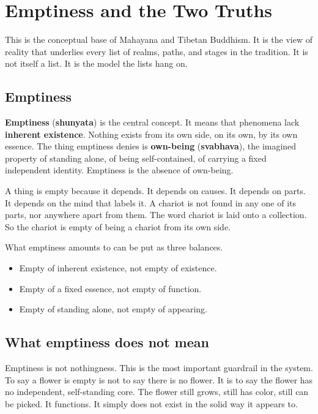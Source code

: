 \section{Emptiness and the Two Truths}

This is the conceptual base of Mahayana and Tibetan Buddhism. It is the view of reality that underlies every list of realms, paths, and stages in the tradition. It is not itself a list. It is the model the lists hang on.

\subsection*{Emptiness}

\textbf{Emptiness} (\textbf{shunyata}) is the central concept. It means that phenomena lack \textbf{inherent existence}. Nothing exists from its own side, on its own, by its own essence. The thing emptiness denies is \textbf{own-being} (\textbf{svabhava}), the imagined property of standing alone, of being self-contained, of carrying a fixed independent identity. Emptiness is the absence of own-being.

A thing is empty because it depends. It depends on causes. It depends on parts. It depends on the mind that labels it. A chariot is not found in any one of its parts, nor anywhere apart from them. The word chariot is laid onto a collection. So the chariot is empty of being a chariot from its own side.

What emptiness amounts to can be put as three balances.

\begin{itemize}
 \item Empty of inherent existence, not empty of existence.
 \item Empty of a fixed essence, not empty of function.
 \item Empty of standing alone, not empty of appearing.
\end{itemize}

\subsection*{What emptiness does not mean}

Emptiness is not nothingness. This is the most important guardrail in the system. To say a flower is empty is not to say there is no flower. It is to say the flower has no independent, self-standing core. The flower still grows, still has color, still can be picked. It functions. It simply does not exist in the solid way it appears to.

